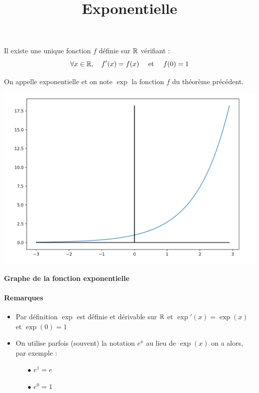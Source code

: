 \documentclass[a4paper, 11pt]{article}
\begin{document}
\title{Exponentielle}
\begin{theorem}
Il existe une unique fonction $f$ définie sur $\mathbb{R}$ vérifiant : 
$$\forall x\in \mathbb{R},\quad f'(x) =f(x) \quad \text{ et } \quad f(0)=1$$
\end{theorem}

\begin{defi}
On appelle exponentielle et on note $\exp$ la fonction $f$ du théorème précédent. 


\end{defi}

\begin{center}
    \centering

\includegraphics[scale=0.25]{CH0 - Calculs/images/exp.png}\par\medskip
    \textbf{Graphe de la fonction exponentielle}
\end{center}
\paragraph{Remarques}
\begin{itemize}
    \item Par définition $\exp$ est définie et dérivable sur $\mathbb{R}$ et $\exp'(x)=\exp(x)$ et $\exp(0)=1$
    \item On utilise parfois (souvent) la notation $e^x$ au lieu de $\exp(x)$ on a alors, par exemple : 
    \begin{itemize}
\item[$\bullet$] $e^1 =e$ 
\item[$\bullet$]  $e^0=1$ 
\end{itemize}
    
\end{itemize}
\end{document}
